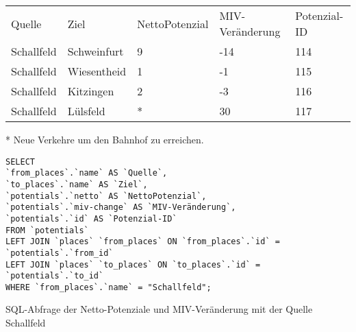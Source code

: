 \begin{tabular}{ l  l  l  l  l }
Quelle & Ziel & NettoPotenzial & MIV-Veränderung & Potenzial-ID\\ 
Schallfeld & Schweinfurt & 9 & -14 & 114\\ 
Schallfeld & Wiesentheid & 1 & -1 & 115\\ 
Schallfeld & Kitzingen & 2 & -3 & 116\\ 
Schallfeld & Lülsfeld & * & 30 & 117\\ 
\end{tabular}    
\newline
\newline
* Neue Verkehre um den Bahnhof zu erreichen.
\newline
\begin{listing}[htbp]
\begin{verbatim}
SELECT
`from_places`.`name` AS `Quelle`, 
`to_places`.`name` AS `Ziel`, 
`potentials`.`netto` AS `NettoPotenzial`, 
`potentials`.`miv-change` AS `MIV-Veränderung`, 
`potentials`.`id` AS `Potenzial-ID`
FROM `potentials`
LEFT JOIN `places` `from_places` ON `from_places`.`id` = `potentials`.`from_id`
LEFT JOIN `places` `to_places` ON `to_places`.`id` = `potentials`.`to_id`
WHERE `from_places`.`name` = "Schallfeld";
\end{verbatim}
\caption{SQL-Abfrage der Netto-Potenziale und MIV-Veränderung mit der Quelle Schallfeld}\label{lst-fz-schallfeld}
\end{listing}